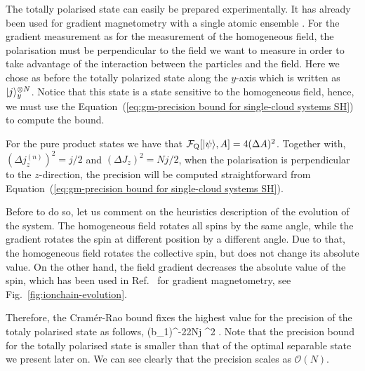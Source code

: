 
The totally polarised state can easily be prepared experimentally.
It has already been used for gradient magnetometry with a single atomic ensemble \cite{Koschorreck2011,Vengalattore2007}.
For the gradient measurement as for the measurement of the homogeneous field, the polarisation must be perpendicular to the field we want to measure in order to take advantage of the interaction between the particles and the field.
Here we chose as before the totally polarized state along the $y$-axis which is written as $\vert{j}\rangle_y^{\otimes N}$.
Notice that this state is a state sensitive to the homogeneous field, hence, we must use the Equation~(\ref{eq:gm-precision bound for single-cloud systems SH}) to compute the bound.

For the pure product states we have that $\mathcal{F}_{\textnormal{Q}}[{\textstyle \vert{\psi}\rangle, A}] = 4(\Delta A)^2$.
Together with,
$(\Delta j_z^{(n)})^2=j/2$ and $(\Delta J_z)^2=Nj/2$, when the polarisation is
perpendicular to the $z$-direction, the precision will be computed straightforward from Equation~(\ref{eq:gm-precision bound for single-cloud systems SH}).

Before to do so, let us comment on the heuristics description of the evolution of the system.
The homogeneous field rotates all spins by the same angle, while the gradient rotates the spin at different position by a different angle.
Due to that, the homogeneous field rotates the collective spin, but does not change its absolute value.
On the other hand, the field gradient decreases the absolute value of the spin, which has been used in Ref.~\cite{Behbood2013} for gradient magnetometry, see Fig.~\ref{fig:ionchain-evolution}.

Therefore, the Cram\'er-Rao bound fixes the highest value for the precision
of the totaly polarised state as follows,
\be
  (\Delta b_1)^{-2}\leqslant 2Nj \sigma^2 .
\ee
Note that the precision bound for the totally polarised state
is smaller than that of the optimal separable state we present later on.
We can see clearly that the precision scales as $\mathcal{O}(N).$


